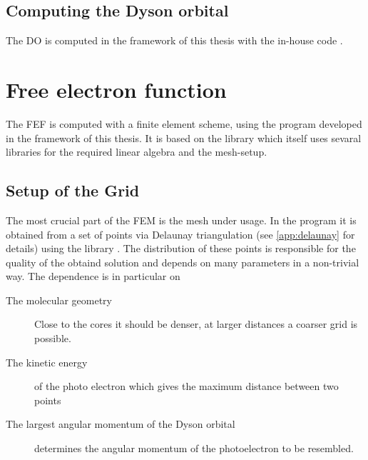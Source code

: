 \subsection{Computing the Dyson orbital}
The DO is computed in the framework of this thesis with the in-house code  \cite{MAgg}.

\section{Free electron function}
The FEF is computed with a finite element scheme, using the program  developed in the framework of this thesis.
It is based on the library  \cite{libmesh} which itself uses sevaral libraries for the required linear algebra and the mesh-setup.

\subsection{Setup of the Grid}
\label{sec:grid}
The most crucial part of the FEM is the mesh under usage. 
In the program  it is obtained from a set of points via Delaunay triangulation (see \ref{app:delaunay} for details) using the library  \cite{tetgen}.
The distribution of these points is responsible for the quality of the obtaind solution and depends on many parameters in a non-trivial way.
The dependence is in particular on
\begin{description}
   \item[The molecular geometry] Close to the cores it should be denser, at larger distances a coarser grid is possible.
   \item[The kinetic energy] of the photo electron which gives the maximum distance between two points
   \item[The largest angular momentum of the Dyson orbital] determines the angular momentum of the photoelectron to be resembled.
\end{description}

